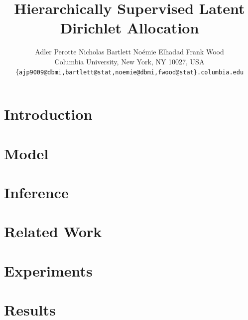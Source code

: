 \documentclass{article}
\title{Hierarchically Supervised Latent Dirichlet Allocation}
\author{
Adler Perotte\hspace{1cm} Nicholas Bartlett \hspace{1cm} No\'emie Elhadad \hspace{1cm} Frank Wood\\
Columbia University, New York, NY 10027, USA \\
\texttt{\{ajp9009@dbmi,bartlett@stat,noemie@dbmi,fwood@stat\}.columbia.edu}
}
\begin{document}
\maketitle

\begin{abstract}

\end{abstract}

\section{Introduction}
\label{sec:introduction}







\section{Model}
\label{sec:model}


\section{Inference}
\label{sec:inference}


\section{Related Work}

\label{sec:related_work} 


\section{Experiments}

\label{sec:experiments}


\section{Results}
\label{sec:results}
\end{document}

